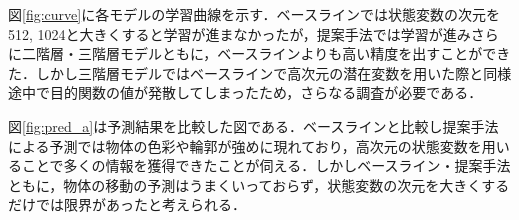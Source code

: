 \documentclass[10pt, twocolumn]{jarticle}
\begin{document}




図\ref{fig:curve}に各モデルの学習曲線を示す．ベースラインでは状態変数の次元を512, 1024と大きくすると学習が進まなかったが，提案手法では学習が進みさらに二階層・三階層モデルともに，ベースラインよりも高い精度を出すことができた．しかし三階層モデルではベースラインで高次元の潜在変数を用いた際と同様途中で目的関数の値が発散してしまったため，さらなる調査が必要である．

図\ref{fig:pred_a}は予測結果を比較した図である．ベースラインと比較し提案手法による予測では物体の色彩や輪郭が強めに現れており，高次元の状態変数を用いることで多くの情報を獲得できたことが伺える．しかしベースライン・提案手法ともに，物体の移動の予測はうまくいっておらず，状態変数の次元を大きくするだけでは限界があったと考えられる．
\end{document}
